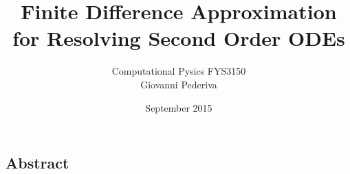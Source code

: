 \documentclass[8pt,a4paper,twocolumn]{article}
\title{Finite Difference Approximation for Resolving Second Order ODEs}
\author{Computational Pysics FYS3150\\ Giovanni Pederiva}
\date{September 2015}
\theoremstyle{plain}
\theoremstyle{definition}
\theoremstyle{remark}
\begin{document}
\begin{twocolumn}

\maketitle 
\subsection*{Abstract}

\end{twocolumn}
\end{document}
